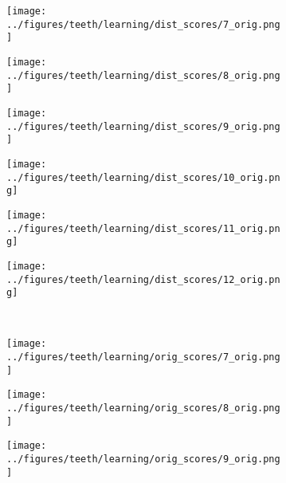 \begin{figure}[h!]
\begin{subfigure}{0.15\textwidth}
		\centering
		\texttt{[image: ../figures/teeth/learning/dist\_scores/7\_orig.png]}
		\label{fig:1}
	\end{subfigure}
	\begin{subfigure}{0.15\textwidth}
		\centering
		\texttt{[image: ../figures/teeth/learning/dist\_scores/8\_orig.png]}
		\label{fig:1}
	\end{subfigure}
	\begin{subfigure}{0.15\textwidth}
		\centering
		\texttt{[image: ../figures/teeth/learning/dist\_scores/9\_orig.png]}
		\label{fig:1}
	\end{subfigure}
	\begin{subfigure}{0.15\textwidth}
		\centering
		\texttt{[image: ../figures/teeth/learning/dist\_scores/10\_orig.png]}
		\label{fig:1}
	\end{subfigure}
	\begin{subfigure}{0.15\textwidth}
		\centering
		\texttt{[image: ../figures/teeth/learning/dist\_scores/11\_orig.png]}
		\label{fig:1}
	\end{subfigure}
	\begin{subfigure}{0.15\textwidth}
		\centering
		\texttt{[image: ../figures/teeth/learning/dist\_scores/12\_orig.png]}
		\label{fig:1}
	\end{subfigure}
	\vspace{-0.35cm}
	\\
	\begin{subfigure}[b]{0.03\textwidth} %
		\centering
	\end{subfigure}
	\begin{subfigure}{0.15\textwidth}
		\centering
		\texttt{[image: ../figures/teeth/learning/orig\_scores/7\_orig.png]}
		\label{fig:1}
	\end{subfigure}
	\begin{subfigure}{0.15\textwidth}
		\centering
		\texttt{[image: ../figures/teeth/learning/orig\_scores/8\_orig.png]}
		\label{fig:1}
	\end{subfigure}
	\begin{subfigure}{0.15\textwidth}
		\centering
		\texttt{[image: ../figures/teeth/learning/orig\_scores/9\_orig.png]}
		\label{fig:1}
	\end{subfigure}
	\begin{subfigure}{0.15\textwidth}

\end{subfigure}
\end{figure}

